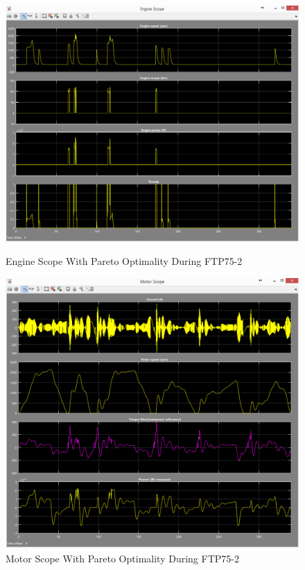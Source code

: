 \begin{figure}[hp]
\centering
\includegraphics[scale=0.465]{figures/Pareto/FTP75-2/engine03Juli}
\caption{Engine Scope With Pareto Optimality During FTP75-2}
\label{fig:epo2}
\includegraphics[scale=0.495]{figures/Pareto/FTP75-2/motor03Juli}
\caption{Motor Scope With Pareto Optimality During FTP75-2}
\label{fig:mpo2}
\end{figure}

